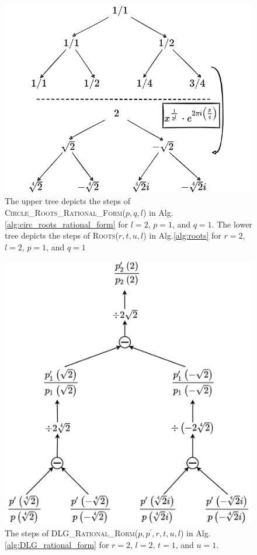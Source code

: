 \documentclass[sigconf]{acmart}
\begin{document}
\begin{figure}[h]
  \centering
  \includegraphics[width=\linewidth]{rational_root_tree.png}
  \caption{The upper tree depicts the steps of \textsc{\textsc{Circle\_Roots\_Rational\_Form}}($p,q,l$) in Alg.\ref{alg:circ_roots_rational_form} for $l=2$, $p=1$, and $q=1$. The lower tree depicts the steps of \textsc{Roots}($r,t,u,l$) in Alg.\ref{alg:roots} for $r=2$, $l=2$, $p=1$, and $q=1$}\label{fig:rat_roots_tree}
  \Description{}
\end{figure}

\begin{figure}[h]
  \centering
  \includegraphics[width=\linewidth]{p_prime.png}
  \caption{The steps of \textsc{DLG\_Rational\_Rorm}($p,p^\prime,r,t,u,l$) in Alg.\ref{alg:DLG_rational_form} for $r=2$, $l=2$, $t=1$, and $u=1$.}\label{fig:DLG}
  \Description{}
\end{figure}
\end{document}
